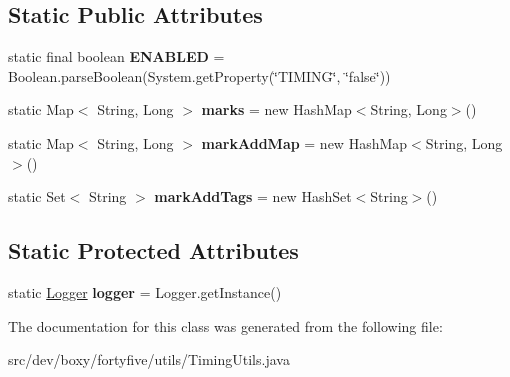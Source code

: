 \subsection*{Static Public Attributes}
\begin{DoxyCompactItemize}
\item 
\hypertarget{classdev_1_1boxy_1_1fortyfive_1_1utils_1_1_timing_utils_a43af6fabf28af35d1567ab7131e407ce}{
static final boolean {\bfseries ENABLED} = Boolean.parseBoolean(System.getProperty(\char`\"{}TIMING\char`\"{}, \char`\"{}false\char`\"{}))}
\label{d7/d4a/classdev_1_1boxy_1_1fortyfive_1_1utils_1_1_timing_utils_a43af6fabf28af35d1567ab7131e407ce}

\item 
\hypertarget{classdev_1_1boxy_1_1fortyfive_1_1utils_1_1_timing_utils_aab5eeafe263b3a4eb2b891975cb7d0f0}{
static Map$<$ String, Long $>$ {\bfseries marks} = new HashMap$<$String, Long$>$()}
\label{d7/d4a/classdev_1_1boxy_1_1fortyfive_1_1utils_1_1_timing_utils_aab5eeafe263b3a4eb2b891975cb7d0f0}

\item 
\hypertarget{classdev_1_1boxy_1_1fortyfive_1_1utils_1_1_timing_utils_a0e22edbcfaa7bb25f29c6c3eed53a19d}{
static Map$<$ String, Long $>$ {\bfseries markAddMap} = new HashMap$<$String, Long$>$()}
\label{d7/d4a/classdev_1_1boxy_1_1fortyfive_1_1utils_1_1_timing_utils_a0e22edbcfaa7bb25f29c6c3eed53a19d}

\item 
\hypertarget{classdev_1_1boxy_1_1fortyfive_1_1utils_1_1_timing_utils_aa17517ab7075f8a8702a0eb8f8682ea1}{
static Set$<$ String $>$ {\bfseries markAddTags} = new HashSet$<$String$>$()}
\label{d7/d4a/classdev_1_1boxy_1_1fortyfive_1_1utils_1_1_timing_utils_aa17517ab7075f8a8702a0eb8f8682ea1}

\end{DoxyCompactItemize}
\subsection*{Static Protected Attributes}
\begin{DoxyCompactItemize}
\item 
\hypertarget{classdev_1_1boxy_1_1fortyfive_1_1utils_1_1_timing_utils_a914e91a03b55518acbd40dba73dcdb38}{
static \hyperlink{classdev_1_1boxy_1_1fortyfive_1_1utils_1_1_logger}{Logger} {\bfseries logger} = Logger.getInstance()}
\label{d7/d4a/classdev_1_1boxy_1_1fortyfive_1_1utils_1_1_timing_utils_a914e91a03b55518acbd40dba73dcdb38}

\end{DoxyCompactItemize}


The documentation for this class was generated from the following file:\begin{DoxyCompactItemize}
\item 
src/dev/boxy/fortyfive/utils/TimingUtils.java\end{DoxyCompactItemize}
